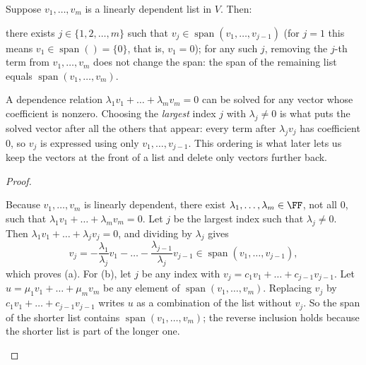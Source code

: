 \documentclass[10pt]{scrartcl}
\DeclareMathOperator{\spn}{span}
\begin{document}
\begin{proposition*}
  Suppose $v_1,\dots,v_m$ is a linearly dependent list in $V$. Then:
  \begin{enumerate}[(a)]
    \ii there exists $j\in\{1,2,\dots,m\}$ such that $v_j \in \spn(v_1,\dots,v_{j-1})$ (for $j=1$ this means $v_1\in\spn()=\{0\}$, that is, $v_1=0$);
    \ii for any such $j$, removing the $j$-th term from $v_1,\dots,v_m$ does not change the span: the span of the remaining list equals $\spn(v_1,\dots,v_m)$.
  \end{enumerate}
\end{proposition*}
\begin{ideabox}
  A dependence relation $\lambda_1v_1+\dots+\lambda_mv_m=0$ can be solved for any vector whose coefficient is nonzero. Choosing the \emph{largest} index $j$ with $\lambda_j\ne 0$ is what puts the solved vector after all the others that appear: every term after $\lambda_jv_j$ has coefficient $0$, so $v_j$ is expressed using only $v_1,\dots,v_{j-1}$. This ordering is what later lets us keep the vectors at the front of a list and delete only vectors further back.
\end{ideabox}
\begin{proof}
  \begin{steps}
    \ii Because $v_1,\dots,v_m$ is linearly dependent, there exist $\lambda_1,\dots,\lambda_m\in\FF$, not all $0$, such that $\lambda_1v_1+\dots+\lambda_mv_m=0$. Let $j$ be the largest index such that $\lambda_j\ne 0$.
    \ii Then $\lambda_1v_1+\dots+\lambda_jv_j=0$, and dividing by $\lambda_j$ gives
    \[
      v_j = -\frac{\lambda_1}{\lambda_j}v_1 - \dots - \frac{\lambda_{j-1}}{\lambda_j}v_{j-1} \in \spn(v_1,\dots,v_{j-1}),
    \]
    which proves (a).
    \ii For (b), let $j$ be any index with $v_j=c_1v_1+\dots+c_{j-1}v_{j-1}$. Let $u=\mu_1v_1+\dots+\mu_mv_m$ be any element of $\spn(v_1,\dots,v_m)$. Replacing $v_j$ by $c_1v_1+\dots+c_{j-1}v_{j-1}$ writes $u$ as a combination of the list without $v_j$. So the span of the shorter list contains $\spn(v_1,\dots,v_m)$; the reverse inclusion holds because the shorter list is part of the longer one.
  \end{steps}
\end{proof}
\end{document}

